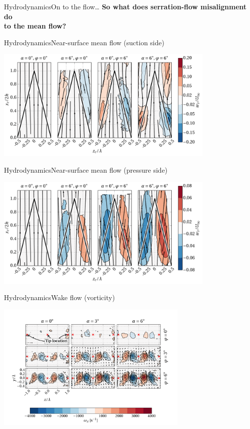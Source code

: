 \documentclass[xcolor=table,aspectratio=169]{beamer}
\begin{document}
\begin{frame}{Hydrodynamics}{On to the flow\ldots}
    \bf \textcolor{LMBlue}{So what does serration-flow misalignment do\\to the mean flow?}
\end{frame}

\begin{frame}[b]{Hydrodynamics}{Near-surface mean flow (suction side)}
    \begin{center}
    \includegraphics[width=0.8\textwidth]{./media/NearSurface-PIV_SidewaysFlowComparisonSS.png}\\
    \end{center}
\end{frame}

\begin{frame}[b]{Hydrodynamics}{Near-surface mean flow (pressure side)}
    \begin{center}
    \includegraphics[width=0.8\textwidth]{./media/NearSurface-PIV_SidewaysFlowComparisonPS.png}
    \end{center}
\end{frame}

\begin{frame}[b]{Hydrodynamics}{Wake flow (vorticity)}
    \vspace{1cm}
    \begin{center}
    \includegraphics[width=0.70\textwidth]{./media/VorticityMatrix.png}
    \end{center}
\end{frame}
\end{document}
